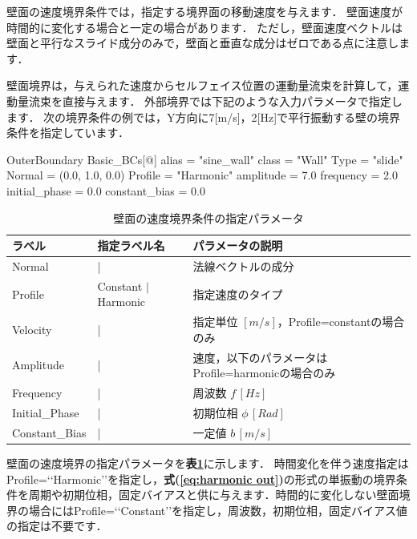 壁面の速度境界条件では，指定する境界面の移動速度を与えます．
壁面速度が時間的に変化する場合と一定の場合があります．
ただし，壁面速度ベクトルは壁面と平行なスライド成分のみで，壁面と垂直な成分はゼロである点に注意します．

壁面境界は，与えられた速度からセルフェイス位置の運動量流束を計算して，運動量流束を直接与えます．
外部境界では下記のような入力パラメータで指定します．
次の境界条件の例では，Y方向に7[m/s]，2[Hz]で平行振動する壁の境界条件を指定しています．

{\small
\begin{program}
OuterBoundary {
  Basic_BCs[@] {
    alias         = "sine_wall"
    class         = "Wall"
    Type          = "slide"
    Normal        = (0.0, 1.0, 0.0)
    Profile       = "Harmonic"
    amplitude     = 7.0
    frequency     = 2.0
    initial_phase = 0.0
    constant_bias = 0.0
  }
}
\end{program}
}

\begin{table}[htdp]
\caption{壁面の速度境界条件の指定パラメータ}
\begin{center}
\small
\begin{tabular}{lll} \toprule
ラベル & 指定ラベル名 & パラメータの説明\\ \midrule
Normal & | & 法線ベクトルの成分\\
Profile & Constant $|$ Harmonic & 指定速度のタイプ\\
Velocity & | & 指定単位 $[m/s]$，Profile=constantの場合のみ\\
Amplitude & | & 速度，以下のパラメータはProfile=harmonicの場合のみ\\
Frequency & | & 周波数 $f\, [Hz]$\\
Initial\_Phase & | & 初期位相 $\phi\, [Rad]$\\
Constant\_Bias & | & 一定値 $b\, [m/s]$\\
\bottomrule
\end{tabular}
\end{center}
\label{tbl:wall parameter out}
\end{table}

壁面の速度境界の指定パラメータを\textbf{表\ref{tbl:wall parameter out}}に示します．
時間変化を伴う速度指定はProfile=\lq\lq Harmonic\rq\rq を指定し，\textbf{式(\ref{eq:harmonic out})}の形式の単振動の境界条件を周期や初期位相，固定バイアスと供に与えます．時間的に変化しない壁面境界の場合にはProfile=\lq\lq Constant\rq\rq を指定し，周波数，初期位相，固定バイアス値の指定は不要です．

